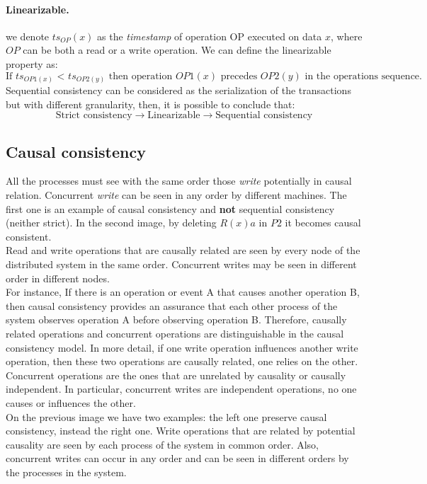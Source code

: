 \paragraph*{Linearizable. } we denote $ts_{OP}(x)$ as the \textit{timestamp} of operation OP executed on data $x$, where $OP$ can be both a read or a write operation. We can define the linearizable property as:
$$\text{If }ts_{OP1(x)}\text{ < }ts_{OP2(y)}\text{ then operation }OP1(x)\text{ precedes }OP2(y)\text{ in the operations sequence.}$$
Sequential consistency can be considered as the serialization of the transactions but with different granularity, then, it is possible to conclude that:
$$\text{Strict consistency} \rightarrow \text{Linearizable} \rightarrow \text{Sequential consistency}$$

\subsection{Causal consistency}
All the processes must see with the same order those \textit{write} potentially in causal relation. Concurrent \textit{write} can be seen in any order by different machines.
The first one is an example of causal consistency and \textbf{not} sequential consistency (neither strict). In the second image, by deleting $R(x)a$ in $P2$ it becomes causal consistent.\\
Read and write operations that are causally related are seen by every node of the distributed system in the same order. Concurrent writes may be seen in different order in different nodes. \\
For instance, If there is an operation or event A that causes another operation B, then causal consistency provides an assurance that each other process of the system observes operation A before observing operation B. Therefore, causally related operations and concurrent operations are distinguishable in the causal consistency model. In more detail, if one write operation influences another write operation, then these two operations are causally related, one relies on the other. Concurrent operations are the ones that are unrelated by causality or causally independent. In particular, concurrent writes are independent operations, no one causes or influences the other. \\

On the previous image we have two examples: the left one preserve causal consistency, instead the right one. Write operations that are related by potential causality are seen by each process of the system in common order. Also, concurrent writes can occur in any order and can be seen in different orders by the processes in the system. 

